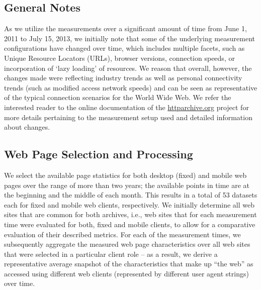 \documentclass[onecolumn,12pt]{IEEEtran}
\begin{document}
\subsection{General Notes}
As we utilize the measurements over a significant amount of time from June 1, 2011 to July 15, 2013, we initially note that some of the underlying measurement configurations have changed over time, which includes multiple facets, such as Unique Resource Locators (URLs), browser versions, connection speeds, or incorporation of `lazy loading' of resources.
We reason that overall, however, the changes made were reflecting industry trends as well as personal connectivity trends (such as modified access network speeds) and can be seen as representative of the typical connection scenarios for the World Wide Web.
We refer the interested reader to the online documentation of the \url{httparchive.org} project for more details pertaining to  the measurement setup used and detailed information about changes.

\subsection{Web Page Selection and Processing}
We select the available page statistics for both desktop (fixed) and mobile web pages over the range of more than two years; the available points in time are at the beginning and the middle of each month.
This results in a total of 53 datasets each for fixed and mobile web clients, respectively.
We initially determine all web sites that are common for both archives, i.e., web sites that for each measurement time were evaluated for both, fixed and mobile clients, to allow for a comparative evaluation of their described metrics.
For each of the measurement times, we subsequently aggregate the measured web page characteristics over all web sites that were selected in a particular client role -- as a result, we derive a representative average snapshot of the characteristics that make up ``the web'' as accessed using different web clients (represented by different user agent strings) over time.
\end{document}
